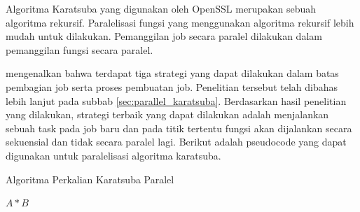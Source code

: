       Algoritma Karatsuba yang digunakan oleh OpenSSL merupakan sebuah algoritma rekursif. Paralelisasi fungsi yang menggunakan algoritma rekursif lebih mudah untuk dilakukan. Pemanggilan job secara paralel dilakukan dalam pemanggilan fungsi secara paralel.

      \citet{parallel_karatsuba_analysis} mengenalkan bahwa terdapat tiga strategi yang dapat dilakukan dalam batas pembagian job serta proses pembuatan job. Penelitian tersebut telah dibahas lebih lanjut  pada subbab \ref{sec:parallel_karatsuba}. Berdasarkan hasil penelitian yang dilakukan, strategi terbaik yang dapat dilakukan adalah menjalankan sebuah task pada job baru dan pada titik tertentu fungsi akan dijalankan secara sekuensial dan tidak secara paralel lagi. Berikut adalah pseudocode yang dapat digunakan untuk paralelisasi algoritma karatsuba.

      \begin{algorithm}
        \caption{Algoritma Perkalian Karatsuba Paralel}
        \label{alg:parallel_karatsuba}
        \begin{algorithmic}
          \Statex
          \State \Return $A * B$
          \EndIf
          \State


          \Else
          \EndIf

          \State

          \State {}
          \EndFunction
        \end{algorithmic}
      \end{algorithm}

